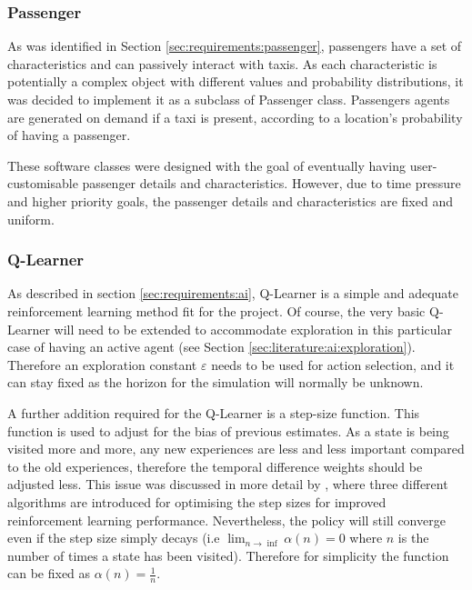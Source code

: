 \subsubsection{Passenger}
\label{sec:implementation:passenger}

As was identified in Section \ref{sec:requirements:passenger}, passengers have
a set of characteristics and can passively interact with taxis. As each
characteristic is potentially a complex object with different values and
probability distributions, it was decided to implement it as a subclass of
Passenger class. Passengers agents are generated on demand if a taxi is
present, according to a location's probability of having a passenger.

These software classes were designed with the goal of eventually having user-
customisable passenger details and characteristics. However, due to time
pressure and higher priority goals, the passenger details and characteristics
are fixed and uniform.


\subsubsection{Q-Learner}
\label{sec:implementation:ai}

As described in section \ref{sec:requirements:ai}, Q-Learner is a simple and
adequate reinforcement learning method fit for the project. Of course, the very
basic Q-Learner will need to be extended to accommodate exploration in this
particular case of having an active agent (see Section
\ref{sec:literature:ai:exploration}). Therefore an exploration constant
\(\varepsilon\) needs to be used for action selection, and it can stay fixed as
the horizon for the simulation will normally be unknown.

A further addition required for the Q-Learner is a step-size function. This
function is used to adjust for the bias of previous estimates. As a state is
being visited more and more, any new experiences are less and less important
compared to the old experiences, therefore the temporal difference weights
should be adjusted less. This issue was discussed in more detail by
\textcite{Sutton1994ai+stepsize}, where three different algorithms are
introduced for optimising the step sizes for improved reinforcement learning
performance. Nevertheless, the policy will still converge even if the step size
simply decays (i.e \(\lim_{n \to \inf}\alpha(n) = 0\) where \(n\) is the number
of times a state has been visited). Therefore for simplicity the function can
be fixed as \(\alpha(n)=\frac{1}{n}\).

